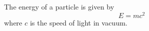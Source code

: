 \documentclass{article}
\begin{document}
The energy of a particle is given by
\[
E = mc^2
\]
where $c$ is the speed of light in vacuum.
\end{document}
